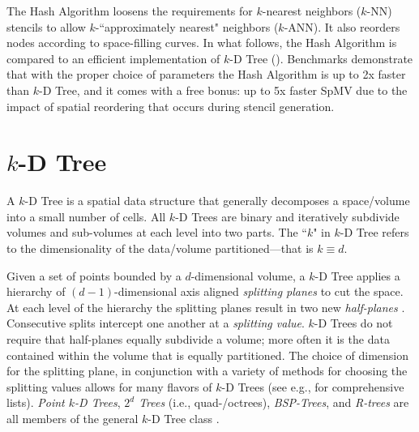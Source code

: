 \documentclass{report}
\begin{document}
The Hash Algorithm loosens the requirements for $k$-nearest neighbors ($k$-NN) stencils to allow $k$-``approximately nearest" neighbors ($k$-ANN). It also reorders nodes according to space-filling curves. In what follows, the Hash Algorithm is compared to an efficient implementation of $k$-D Tree (\cite{TagliasacchiMFE}). Benchmarks demonstrate that with the proper choice of parameters the Hash Algorithm is up to 2x faster than $k$-D Tree, and it comes with a free bonus: up to 5x faster SpMV due to the impact of spatial reordering that occurs during stencil generation. 


\section{$k$-D Tree}

A $k$-D Tree is a spatial data structure that generally decomposes a space/volume into a small number of cells. All $k$-D Trees are binary and iteratively subdivide volumes and sub-volumes at each level into two parts. The ``$k$" in $k$-D Tree refers to the dimensionality of the data/volume  partitioned---that is $k \equiv d$. 


Given a set of points bounded by a $d$-dimensional volume, a $k$-D Tree applies a hierarchy of $(d-1)$-dimensional axis aligned \emph{splitting planes} to cut the space. At each level of the hierarchy the splitting planes result in two new \emph{half-planes} \cite{Skiena2008}. Consecutive splits intercept one another at a \emph{splitting value}. $k$-D Trees do not require that half-planes equally subdivide a volume; more often it is the data contained within the volume that is equally partitioned. The choice of dimension for the splitting plane, in conjunction with a variety of methods for choosing the splitting values allows for many flavors of $k$-D Trees (see e.g., \cite{Samet2005, Skiena2008, Berg2008} for comprehensive lists). \emph{Point $k$-D Trees}, \emph{$2^d$ Trees} (i.e., quad-/octrees), \emph{BSP-Trees}, and \emph{R-trees} are all members of the general $k$-D Tree class \cite{Skiena2008,Ying2006}.
\end{document}
